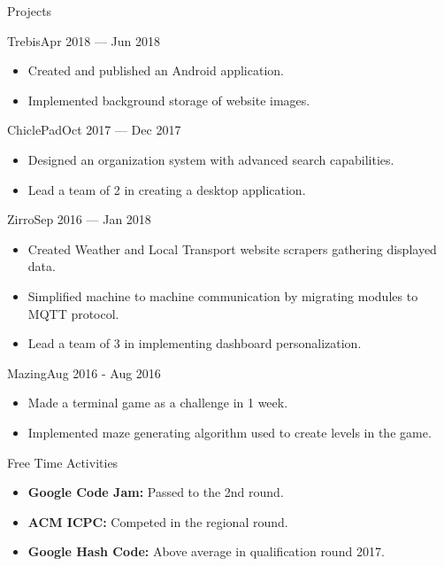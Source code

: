 \documentclass[]{style}
\begin{document}
	\begin{cvsection}{Projects}
	    \begin{cvsubsection}{Trebis}{}{Apr 2018 — Jun 2018}
			\begin{itemize}
				\item Created and published an Android application.
				\item Implemented background storage of website images.
			\end{itemize}
		\end{cvsubsection}
		
	    \begin{cvsubsection}{ChiclePad}{}{Oct 2017 — Dec 2017}
			\begin{itemize}
				\item Designed an organization system with advanced search capabilities.
				\item Lead a team of 2 in creating a desktop application.
			\end{itemize}
		\end{cvsubsection}
		
		\begin{cvsubsection}{Zirro}{}{Sep 2016 — Jan 2018}
			\begin{itemize}
				\item Created Weather and Local Transport website scrapers gathering displayed data.
				\item Simplified machine to machine communication by migrating modules to MQTT protocol.
				\item Lead a team of 3 in implementing dashboard personalization.
			\end{itemize}
		\end{cvsubsection}

		\begin{cvsubsection}{Mazing}{}{Aug 2016 - Aug 2016}
			\begin{itemize}
				\item Made a terminal game as a challenge in 1 week.
				\item Implemented maze generating algorithm used to create levels in the game. 
			\end{itemize}
		\end{cvsubsection}
	\end{cvsection}
	
	\begin{cvsection}{Free Time Activities}
		\begin{cvsubsection}{}{}{}	
			\begin{itemize}
				\item \textbf{Google Code Jam:} Passed to the 2nd round.
                \item \textbf{ACM ICPC:} Competed in the regional round.
                \item \textbf{Google Hash Code:} Above average in qualification round 2017.
			\end{itemize}
		\end{cvsubsection}
	\end{cvsection}
	
\end{document}
